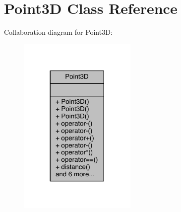 \hypertarget{class_point3_d}{}\section{Point3D Class Reference}
\label{class_point3_d}


Collaboration diagram for Point3D\+:
\nopagebreak
\begin{figure}[H]
\begin{center}
\leavevmode
\includegraphics[width=161pt]{doxygen/latex/class_point3_d__coll__graph}
\end{center}
\end{figure}
